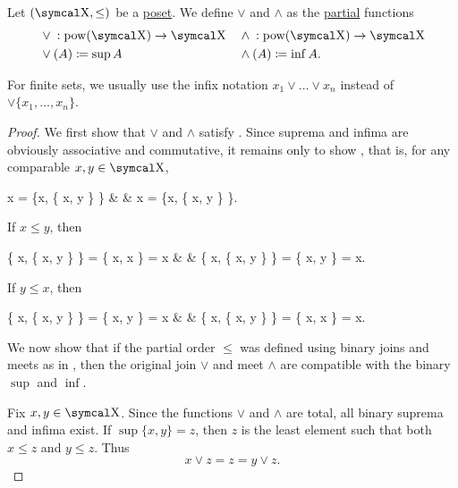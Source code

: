 \begin{definition}\label{def:lattice_operations}
  Let \( (\CX, \leq) \) be a \hyperref[def:poset]{poset}. We define  \( \vee \) and  \( \wedge \) as the \hyperref[def:function/partial]{partial} functions
  \begin{align*}
    &{}\vee{}: \Pow(\CX) \to \CX
    &&{}\wedge{}: \Pow(\CX) \to \CX
    \\
    & \vee(A) \coloneqq \sup A
    && \wedge(A) \coloneqq \inf A.
  \end{align*}

  For finite sets, we usually use the infix notation \( x_1 \vee \ldots \vee x_n \) instead of \( \vee \{ x_1, \ldots, x_n \} \).
\end{definition}
\begin{proof}
  We first show that \( \vee \) and \( \wedge \) satisfy . Since suprema and infima are obviously associative and commutative, it remains only to show , that is, for any comparable \( x, y \in \CX \),
  \begin{BreakableAlign*}
    x = \sup \{x, \inf \{ x, y \} \}
     &  &
    x = \inf \{x, \sup \{ x, y \} \}.
  \end{BreakableAlign*}

  If \( x \leq y \), then
  \begin{BreakableAlign*}
    \sup \{ x, \inf \{ x, y \} \} = \sup \{ x, x \} = x
     &  &
    \inf \{ x, \sup \{ x, y \} \} = \inf \{ x, y \} = x.
  \end{BreakableAlign*}

  If \( y \leq x \), then
  \begin{BreakableAlign*}
    \sup \{ x, \inf \{ x, y \} \} = \sup \{ x, y \} = x
     &  &
    \inf \{ x, \sup \{ x, y \} \} = \inf \{ x, x \} = x.
  \end{BreakableAlign*}

  We now show that if the partial order \( \leq \) was defined using binary joins and meets as in , then the original join \( \vee \) and meet \( \wedge \) are compatible with the binary \( \sup \) and \( \inf \).

  Fix \( x, y \in \CX \). Since the functions \( \vee \) and \( \wedge \) are total, all binary suprema and infima exist. If \( \sup \{ x, y \} = z \), then \( z \) is the least element such that both \( x \leq z \) and \( y \leq z \). Thus
  \begin{equation*}
    x \vee z = z = y \vee z.
  \end{equation*}


\end{proof}
